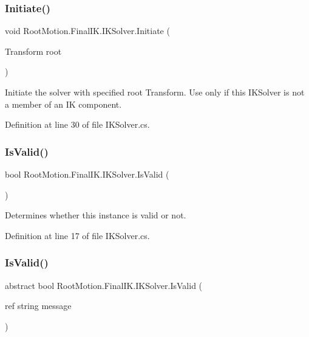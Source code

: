 \subsubsection{\texorpdfstring{Initiate()}{Initiate()}}
{\footnotesize\ttfamily void Root\+Motion.\+Final\+I\+K.\+I\+K\+Solver.\+Initiate (\begin{DoxyParamCaption}\item[{Transform}]{root }\end{DoxyParamCaption})}



Initiate the solver with specified root Transform. Use only if this I\+K\+Solver is not a member of an IK component. 



Definition at line 30 of file I\+K\+Solver.\+cs.

\mbox{\label{class_root_motion_1_1_final_i_k_1_1_i_k_solver_a05cf2b47406dab8d7c9003d3e43c0abe}} 
\subsubsection{\texorpdfstring{Is\+Valid()}{IsValid()}\hspace{0.1cm}{\footnotesize\ttfamily [1/2]}}
{\footnotesize\ttfamily bool Root\+Motion.\+Final\+I\+K.\+I\+K\+Solver.\+Is\+Valid (\begin{DoxyParamCaption}{ }\end{DoxyParamCaption})}



Determines whether this instance is valid or not. 



Definition at line 17 of file I\+K\+Solver.\+cs.

\mbox{\label{class_root_motion_1_1_final_i_k_1_1_i_k_solver_a6ccc7496e7f4e95668e1c1bdaa051d67}} 
\subsubsection{\texorpdfstring{Is\+Valid()}{IsValid()}\hspace{0.1cm}{\footnotesize\ttfamily [2/2]}}
{\footnotesize\ttfamily abstract bool Root\+Motion.\+Final\+I\+K.\+I\+K\+Solver.\+Is\+Valid (\begin{DoxyParamCaption}\item[{ref string}]{message }\end{DoxyParamCaption})\hspace{0.3cm}{\ttfamily [pure virtual]}}



